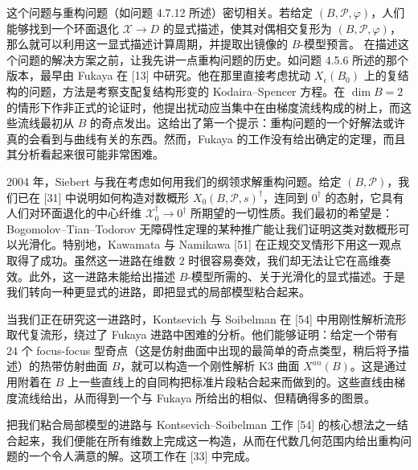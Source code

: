 这个问题与重构问题（如问题 4.7.12 所述）密切相关。若给定 $(B,\mathcal{P},\varphi)$，人们能够找到一个环面退化 $\mathcal{X}\to D$ 的显式描述，使其对偶相交复形为 $(B,\mathcal{P},\varphi)$，那么就可以利用这一显式描述计算周期，并提取出镜像的 $B$-模型预言。
在描述这个问题的解决方案之前，让我先讲一点重构问题的历史。如问题 4.5.6 所述的那个版本，最早由 Fukaya 在 [13] 中研究。他在那里直接考虑扰动 $X_\epsilon(B_0)$ 上的复结构的问题，方法是考察支配复结构形变的 Kodaira--Spencer 方程。在 $\dim B=2$ 的情形下作非正式的论证时，他提出扰动应当集中在由梯度流线构成的树上，而这些流线最初从 $B$ 的奇点发出。这给出了第一个提示：重构问题的一个好解法或许真的会看到与曲线有关的东西。然而，Fukaya 的工作没有给出确定的定理，而且其分析看起来很可能非常困难。

2004 年，Siebert 与我在考虑如何用我们的纲领求解重构问题。给定 $(B,\mathcal{P})$，我们已在 [31] 中说明如何构造对数概形 $X_0(B,\mathcal{P},s)^\dagger$，连同到 $0^\dagger$ 的态射，它具有人们对环面退化的中心纤维 $\mathcal{X}_0^\dagger\to 0^\dagger$ 所期望的一切性质。我们最初的希望是：Bogomolov--Tian--Todorov 无障碍性定理的某种推广能让我们证明这类对数概形可以光滑化。特别地，Kawamata 与 Namikawa [51] 在正规交叉情形下用这一观点取得了成功。虽然这一进路在维数 $2$ 时很容易奏效，我们却无法让它在高维奏效。此外，这一进路未能给出描述 $B$-模型所需的、关于光滑化的显式描述。于是我们转向一种更显式的进路，即把显式的局部模型粘合起来。

当我们正在研究这一进路时，Kontsevich 与 Soibelman 在 [54] 中用刚性解析流形取代复流形，绕过了 Fukaya 进路中困难的分析。他们能够证明：给定一个带有 $24$ 个 focus-focus 型奇点（这是仿射曲面中出现的最简单的奇点类型，稍后将予描述）的热带仿射曲面 $B$，就可以构造一个刚性解析 K3 曲面 $X^{an}(B)$。这是通过用附着在 $B$ 上一些直线上的自同构把标准片段粘合起来而做到的。这些直线由梯度流线给出，从而得到一个与 Fukaya 所给出的相似、但精确得多的图景。

把我们粘合局部模型的进路与 Kontsevich--Soibelman 工作 [54] 的核心想法之一结合起来，我们便能在所有维数上完成这一构造，从而在代数几何范围内给出重构问题的一个令人满意的解。这项工作在 [33] 中完成。

